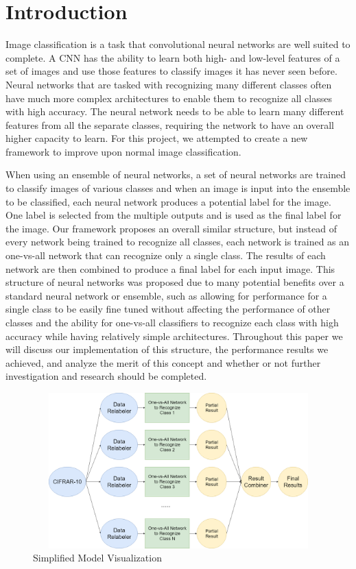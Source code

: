 \documentclass[10pt,twocolumn,letterpaper]{article}
\begin{document}
\section{Introduction}
Image classification is a task that convolutional neural networks are well suited to complete. A CNN has the ability to learn both high- and low-level features of a set of images and use those features to classify images it has never seen before. Neural networks that are tasked with recognizing many different classes often have much more complex architectures to enable them to recognize all classes with high accuracy. The neural network needs to be able to learn many different features from all the separate classes, requiring the network to have an overall higher capacity to learn. For this project, we attempted to create a new framework to improve upon normal image classification.

When using an ensemble of neural networks, a set of neural networks are trained to classify images of various classes and when an image is input into the ensemble to be classified, each neural network produces a potential label for the image. One label is selected from the multiple outputs and is used as the final label for the image. Our framework proposes an overall similar structure, but instead of every network being trained to recognize all classes, each network is trained as an one-vs-all network that can recognize only a single class. The results of each network are then combined to produce a final label for each input image. This structure of neural networks was proposed due to many potential benefits over a standard neural network or ensemble, such as allowing for performance for a single class to be easily fine tuned without affecting the performance of other classes and the ability for one-vs-all classifiers to recognize each class with high accuracy while having relatively simple architectures. Throughout this paper we will discuss our implementation of this structure, the performance results we achieved, and analyze the merit of this concept and whether or not further investigation and research should be completed.

\begin{figure}
	\begin{center}
	\includegraphics[width=12cm,height=6cm]{architecture_revised.png}
	\end{center}
	\caption{Simplified Model Visualization}
\end{figure}
\end{document}

